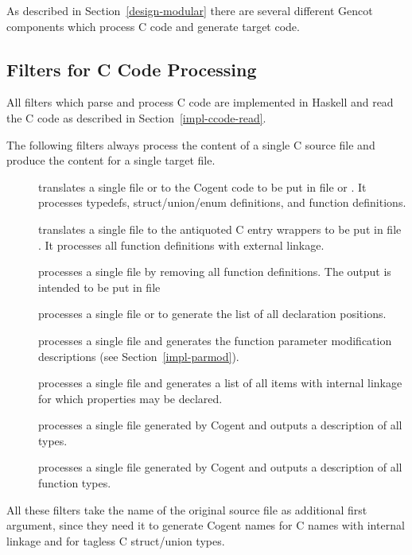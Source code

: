 As described in Section~\ref{design-modular} there are several different Gencot components which process C code and generate 
target code.

\subsection{Filters for C Code Processing}
\label{impl-ccomps-filters}

All filters which parse and process C code are implemented in Haskell and read the
C code as described in Section~\ref{impl-ccode-read}.

The following filters always process the content of a single C source file and produce the content for a single 
target file.
\begin{description}
\item[] translates a single file  or  to the Cogent code to be put in file
 or . It processes typedefs, struct/union/enum definitions, and function
definitions. 
\item[] translates a single file  to the antiquoted C entry wrappers to be put in
file . It processes all function definitions with external linkage.
\item[] processes a single file  by removing all function definitions. The output
is intended to be put in file 
\item[] processes a single file  or  to generate the list of
all declaration positions.
\item[] processes a single file  and generates the 
function parameter modification descriptions (see Section~\ref{impl-parmod}).
\item[] processes a single file  and generates a list of all items with internal linkage 
for which properties may be declared.
\item[] processes a single file  generated by Cogent and outputs a description
of all  types.
\item[] processes a single file  generated by Cogent and outputs a description
of all function types.
\end{description}

All these filters take the name of the original source file as additional first
argument, since they need it to generate Cogent names for C names with internal linkage and for tagless C struct/union
types.

